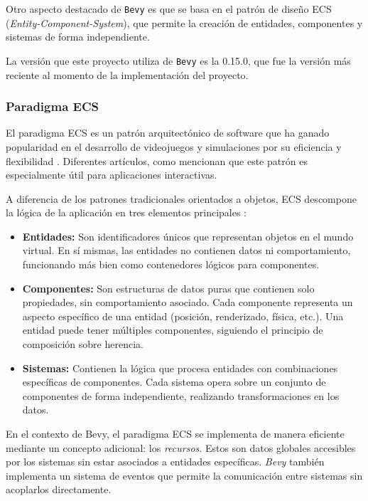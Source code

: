 Otro aspecto destacado de \texttt{Bevy} es que se basa en el patrón de diseño ECS (\textit{Entity-Component-System}), que permite la creación de entidades, componentes y sistemas de forma independiente. 

La versión que este proyecto utiliza de \texttt{Bevy} es la 0.15.0, que fue la versión más reciente al momento de la implementación del proyecto.

\subsubsection{Paradigma \acs{ECS}} \label{subsec:ecs}

El paradigma \ac{ECS} es un patrón arquitectónico de software que ha ganado popularidad en el desarrollo de videojuegos y simulaciones por su eficiencia y flexibilidad \autocite{prdevingDeepdivingEntityComponent2023}. Diferentes artículos, como \autocite{zaksWhenNotUse2018} mencionan que este patrón es especialmente útil para aplicaciones interactivas.

A diferencia de los patrones tradicionales orientados a objetos, \ac{ECS} descompone la lógica de la aplicación en tres elementos principales \autocite{SistemaComponentesEntidad2024}:

\begin{itemize}
    \item \textbf{Entidades:} Son identificadores únicos que representan objetos en el mundo virtual. En sí mismas, las entidades no contienen datos ni comportamiento, funcionando más bien como contenedores lógicos para componentes.
    
    \item \textbf{Componentes:} Son estructuras de datos puras que contienen solo propiedades, sin comportamiento asociado. Cada componente representa un aspecto específico de una entidad (posición, renderizado, física, etc.). Una entidad puede tener múltiples componentes, siguiendo el principio de composición sobre herencia.
    
    \item \textbf{Sistemas:} Contienen la lógica que procesa entidades con combinaciones específicas de componentes. Cada sistema opera sobre un conjunto de componentes de forma independiente, realizando transformaciones en los datos.
\end{itemize}

En el contexto de Bevy, el paradigma \ac{ECS} se implementa de manera eficiente mediante un concepto adicional: los \textit{recursos}. Estos son datos globales accesibles por los sistemas sin estar asociados a entidades específicas. \textit{Bevy} también implementa un sistema de eventos que permite la comunicación entre sistemas sin acoplarlos directamente.

